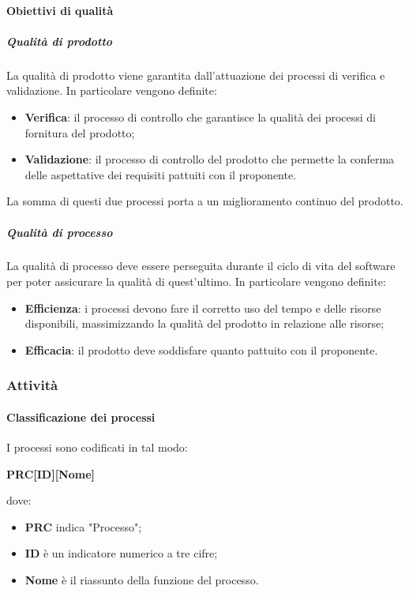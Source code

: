 \documentclass[../norme-di-progetto.tex]{subfiles}
\begin{document}
\paragraph{Obiettivi di qualità}
\subparagraph{Qualità di prodotto}
La qualità di prodotto viene garantita dall'attuazione dei processi di verifica e validazione. In particolare vengono definite:
\begin{itemize}
  \item \textbf{Verifica}: il processo di controllo che garantisce la qualità dei processi di fornitura del prodotto;
  \item \textbf{Validazione}: il processo di controllo del prodotto che permette la conferma delle aspettative dei requisiti pattuiti con il proponente.
\end{itemize}
La somma di questi due processi porta a un miglioramento continuo del prodotto.

\subparagraph{Qualità di processo}
La qualità di processo deve essere perseguita durante il ciclo di vita del software per poter assicurare la qualità di quest'ultimo. In particolare vengono definite:
\begin{itemize}
  \item \textbf{Efficienza}: i processi devono fare il corretto uso del tempo e delle risorse disponibili, massimizzando la qualità del prodotto in relazione alle risorse;
  \item \textbf{Efficacia}: il prodotto deve soddisfare quanto pattuito con il proponente.
\end{itemize}

\subsubsection{Attività}
\paragraph{Classificazione dei processi}
I processi sono codificati in tal modo: \\
\begin{center}
  \centering
  \textbf{PRC[ID][Nome]}
\end{center} dove:
\begin{itemize}
  \item \textbf{PRC} indica "Processo";
  \item \textbf{ID} è un indicatore numerico a tre cifre;
  \item \textbf{Nome} è il riassunto della funzione del processo.
\end{itemize}
\end{document}
